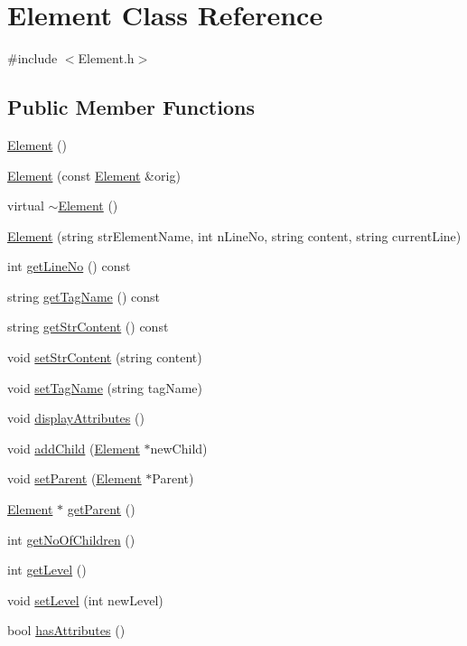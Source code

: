 \hypertarget{class_element}{\section{Element Class Reference}
\label{class_element}
}


{\ttfamily \#include $<$Element.\+h$>$}

\subsection*{Public Member Functions}
\begin{DoxyCompactItemize}
\item 
\hyperlink{class_element_ab0d0e20be9a36ae676202db753faeec9}{Element} ()
\item 
\hyperlink{class_element_a6b1a7cd51ec49606308cd7574a3f1543}{Element} (const \hyperlink{class_element}{Element} \&orig)
\item 
virtual \hyperlink{class_element_a13d54ba9c08b6bec651402f1c2bb002c}{$\sim$\+Element} ()
\item 
\hyperlink{class_element_a78ecd3c39476bafdb481366208503e1d}{Element} (string str\+Element\+Name, int n\+Line\+No, string content, string current\+Line)
\item 
int \hyperlink{class_element_a0df9ef693c7789f8d96082d443fa5599}{get\+Line\+No} () const 
\item 
string \hyperlink{class_element_a68be77d255e5e4a27620ac9267e431b0}{get\+Tag\+Name} () const 
\item 
string \hyperlink{class_element_ad5dd0f5ac62f575e2faad832b98e6e03}{get\+Str\+Content} () const 
\item 
void \hyperlink{class_element_a78f1d57cb2d35d4afcfcce667c027e5c}{set\+Str\+Content} (string content)
\item 
void \hyperlink{class_element_ab4a3675e61ce853251171a58b345fa8c}{set\+Tag\+Name} (string tag\+Name)
\item 
void \hyperlink{class_element_ab1df8a254bbdec0d3426d5c34a9c1963}{display\+Attributes} ()
\item 
void \hyperlink{class_element_a57f4778507a7422271206f948ff935db}{add\+Child} (\hyperlink{class_element}{Element} $\ast$new\+Child)
\item 
void \hyperlink{class_element_aa082a15e61c5ba173a2645bcc40effb4}{set\+Parent} (\hyperlink{class_element}{Element} $\ast$Parent)
\item 
\hyperlink{class_element}{Element} $\ast$ \hyperlink{class_element_a3267b237ad82b8708aa95515fb111a56}{get\+Parent} ()
\item 
int \hyperlink{class_element_aefe3c479a2b83a227c1b13ec60a9009e}{get\+No\+Of\+Children} ()
\item 
int \hyperlink{class_element_afae9a641dc3ebc13af5fcc537d8ea8c1}{get\+Level} ()
\item 
void \hyperlink{class_element_a24c9693dc13d4e47c60923f1e492304e}{set\+Level} (int new\+Level)
\item 
bool \hyperlink{class_element_adeda43b6b12c7ce7c18f5a6ac6ed5ffd}{has\+Attributes} ()
\end{DoxyCompactItemize}

